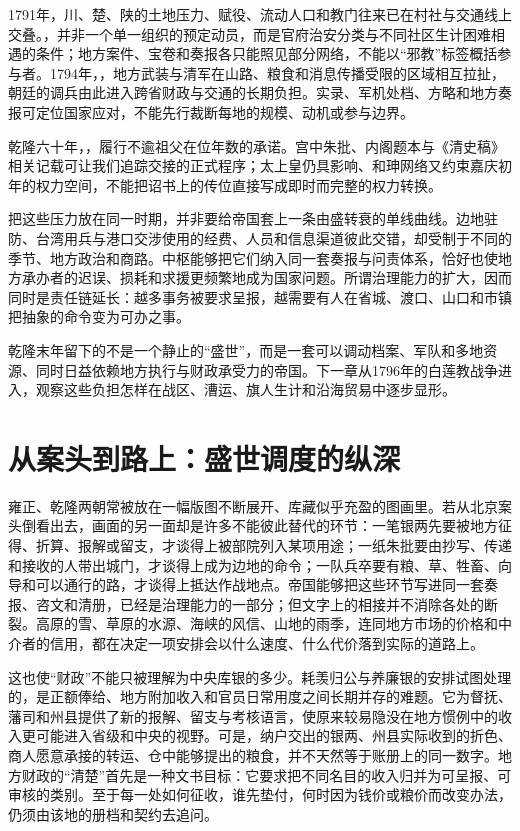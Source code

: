 1791年，川、楚、陕的土地压力、赋役、流动人口和教门往来已在村社与交通线上交叠。，并非一个单一组织的预定动员，而是官府治安分类与不同社区生计困难相遇的条件；地方案件、宝卷和奏报各只能照见部分网络，不能以“邪教”标签概括参与者。1794年，，地方武装与清军在山路、粮食和消息传播受限的区域相互拉扯，朝廷的调兵由此进入跨省财政与交通的长期负担。实录、军机处档、方略和地方奏报可定位国家应对，不能先行裁断每地的规模、动机或参与边界。

乾隆六十年，，履行不逾祖父在位年数的承诺。宫中朱批、内阁题本与《清史稿》相关记载可让我们追踪交接的正式程序；太上皇仍具影响、和珅网络又约束嘉庆初年的权力空间，不能把诏书上的传位直接写成即时而完整的权力转换。

把这些压力放在同一时期，并非要给帝国套上一条由盛转衰的单线曲线。边地驻防、台湾用兵与港口交涉使用的经费、人员和信息渠道彼此交错，却受制于不同的季节、地方政治和商路。中枢能够把它们纳入同一套奏报与问责体系，恰好也使地方承办者的迟误、损耗和求援更频繁地成为国家问题。所谓治理能力的扩大，因而同时是责任链延长：越多事务被要求呈报，越需要有人在省城、渡口、山口和市镇把抽象的命令变为可办之事。

乾隆末年留下的不是一个静止的“盛世”，而是一套可以调动档案、军队和多地资源、同时日益依赖地方执行与财政承受力的帝国。下一章从1796年的白莲教战争进入，观察这些负担怎样在战区、漕运、旗人生计和沿海贸易中逐步显形。

\section{从案头到路上：盛世调度的纵深}

雍正、乾隆两朝常被放在一幅版图不断展开、库藏似乎充盈的图画里。若从北京案头倒看出去，画面的另一面却是许多不能彼此替代的环节：一笔银两先要被地方征得、折算、报解或留支，才谈得上被部院列入某项用途；一纸朱批要由抄写、传递和接收的人带出城门，才谈得上成为边地的命令；一队兵卒要有粮、草、牲畜、向导和可以通行的路，才谈得上抵达作战地点。帝国能够把这些环节写进同一套奏报、咨文和清册，已经是治理能力的一部分；但文字上的相接并不消除各处的断裂。高原的雪、草原的水源、海峡的风信、山地的雨季，连同地方市场的价格和中介者的信用，都在决定一项安排会以什么速度、什么代价落到实际的道路上。

这也使“财政”不能只被理解为中央库银的多少。耗羡归公与养廉银的安排试图处理的，是正额俸给、地方附加收入和官员日常用度之间长期并存的难题。它为督抚、藩司和州县提供了新的报解、留支与考核语言，使原来较易隐没在地方惯例中的收入更可能进入省级和中央的视野。可是，纳户交出的银两、州县实际收到的折色、商人愿意承接的转运、仓中能够提出的粮食，并不天然等于账册上的同一数字。地方财政的“清楚”首先是一种文书目标：它要求把不同名目的收入归并为可呈报、可审核的类别。至于每一处如何征收，谁先垫付，何时因为钱价或粮价而改变办法，仍须由该地的册档和契约去追问。

